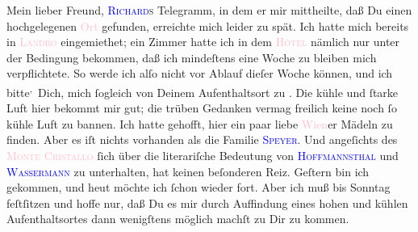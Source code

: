 \pstart{}Mein lieber Freund,\pend
\pstart
           \textsc{\textcolor{blue}{Richard}{}\ledrightnote{\textcolor{blue}{Richard Beer-Hofmann}}s} Telegramm, in dem er mir
               mittheilte, daß Du einen hochgelegenen \textcolor{pink}{Ort}{}\ledrightnote{{$\rightarrow$}\textcolor{pink}{Vahrn}} gefunden, erreichte mich leider zu spät. Ich hatte mich
               bereits in \textsc{\textcolor{pink}{Landro}{}\ledrightnote{\textcolor{pink}{Höhlenstein}}} eingemiethet; ein Zimmer hatte ich in dem \textsc{\textcolor{pink}{Hôtel}{}\ledrightnote{{$\rightarrow$}\textcolor{pink}{Hotel Baur}}} nämlich nur \strikeout{\textcolor{gray}{×}\-\textcolor{gray}{×}} unter der Bedingung bekommen, daß ich mindeſtens eine Woche zu bleiben mich
               verpflichtete. So werde ich alſo nicht vor Ablauf dieſer Woche \label{K_L03077-1v}\label{K_L03077-1h} können, und ich bitte\substVorne{}\textsuperscript{,}\substDazwischen{} D\substHinten{}ich, mich ſogleich von Deinem Aufenthaltsort zu \label{K_L03077-2v}\label{K_L03077-2h}. Die kühle und ſtarke Luft hier bekommt mir
               gut; die trüben Gedanken vermag freilich keine noch ſo kühle Luft zu bannen. Ich
               hatte gehofft, hier ein paar liebe \textcolor{pink}{Wien}{}\ledrightnote{\textcolor{pink}{Wien}}er Mädeln
               zu finden. Aber es iſt nichts vorhanden als die Familie {\pb}\textsc{\textcolor{blue}{Speyer}{}\ledrightnote{\textcolor{blue}{Nanette Speyer}{\newline}\textcolor{blue}{Albert Speyer}}}. Und angeſichts des \textsc{\textcolor{pink}{Monte Cristallo}{}\ledrightnote{\textcolor{pink}{Monte Cristallo}}} ſich über die literariſche Bedeutung von \textsc{\textcolor{blue}{Hoffmannsthal}{}\ledrightnote{\textcolor{blue}{Hugo von Hofmannsthal}}} und \textsc{\textcolor{blue}{Wassermann}{}\ledrightnote{\textcolor{blue}{Jakob Wassermann}}} zu unterhalten, hat keinen beſonderen Reiz. Geſtern bin ich gekommen, und heut möchte
               ich ſchon wieder fort. Aber ich muß bis Sonntag
               feſtſitzen und hoffe nur, daß Du es mir durch Auffindung eines hohen und kühlen
               Aufenthaltsortes dann wenigſtens möglich\strikeout{\textcolor{gray}{ſt}} machſt zu Dir zu kommen.\pend
           
